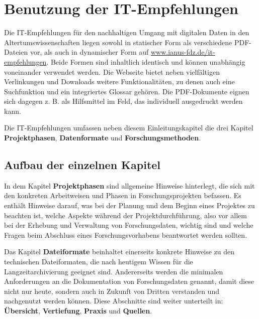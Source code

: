\newpage
\section{Benutzung der IT-Empfehlungen}
Die IT-Empfehlungen für den nachhaltigen Umgang mit digitalen Daten in den Altertumswissenschaften liegen sowohl in statischer Form als verschiedene PDF-Dateien vor, als auch in dynamischer Form auf \href{https://www.ianus-fdz.de/it-empfehlungen}{www.ianus-fdz.de/it-empfehlungen}. Beide Formen sind inhaltlich identisch und können unabhängig voneinander verwendet werden. Die Webseite bietet neben vielfältigen Verlinkungen und Downloads weitere Funktionalitäten, zu denen auch eine Suchfunktion und ein integriertes Glossar gehören. Die PDF-Dokumente eignen sich dagegen z. B. als Hilfsmittel im Feld, das individuell ausgedruckt werden kann.

Die IT-Empfehlungen umfassen neben diesem Einleitungskapitel die drei Kapitel \textbf{Projektphasen}, \textbf{Datenformate} und \textbf{Forschungsmethoden}.

\subsection*{Aufbau der einzelnen Kapitel}
In dem Kapitel \textbf{Projektphasen} sind allgemeine Hinweise hinterlegt, die sich mit den konkreten Arbeitweisen und Phasen in Forschungsprojekten befassen. Es enthält Hinweise darauf, was bei der Planung und dem Beginn eines Projektes zu beachten ist, welche Aspekte während der Projektdurchführung, also vor allem bei der Erhebung und Verwaltung von Forschungsdaten, wichtig sind und welche Fragen beim Abschluss eines Forschungsvorhabens beantwortet werden sollten. 

Das Kapitel \textbf{Dateiformate} beinhaltet einerseits konkrete Hinweise zu den technischen Dateiformaten, die nach heutigem Wissen für die Langzeitarchivierung geeignet sind. Andererseits werden die minimalen Anforderungen an die Dokumentation von Forschungsdaten genannt, damit diese nicht nur heute, sondern auch in Zukunft von Dritten verstanden und nachgenutzt werden können. Diese Abschnitte sind weiter unterteilt in: \textbf{Übersicht}, \textbf{Vertiefung}, \textbf{Praxis} und \textbf{Quellen}.

